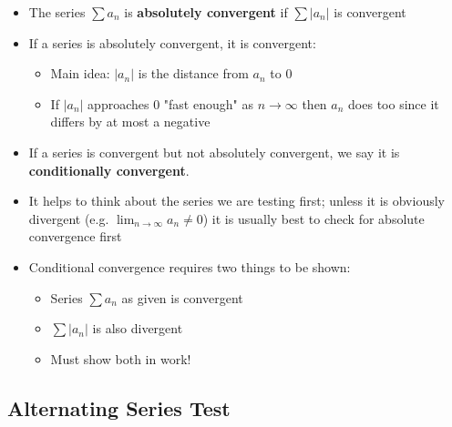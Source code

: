 \documentclass[letterpaper, 11pt, openany]{book}
\theoremstyle{mytheoremstyle}
\theoremstyle{myexamplestyle}
\begin{document}
\begin{itemize}
    \item The series $\sum a_{n}$ is \textbf{absolutely convergent} if $\sum |a_{n}|$ is convergent
    \item If a series is absolutely convergent, it is convergent:
    \begin{itemize}
        \item Main idea: $|a_{n}|$ is the distance from $a_{n}$ to 0
        \item If $|a_{n}|$ approaches 0 "fast enough" as $n \to \infty$ then $a_{n}$ does too since it differs by at most a negative
    \end{itemize}
    \item If a series is convergent but not absolutely convergent, we say it is \textbf{conditionally convergent}.
    \item It helps to think about the series we are testing first; unless it is obviously divergent (e.g. $\displaystyle \lim_{n \to \infty} a_{n} \neq 0$) it is usually best to check for absolute convergence first
    \item Conditional convergence requires two things to be shown:
    \begin{itemize}
        \item Series $\displaystyle \sum a_{n}$ as given is convergent
        \item $\displaystyle \sum |a_{n}|$ is also divergent
        \item[{\faExclamationTriangle[solid]}] Must show both in work!
    \end{itemize}
\end{itemize}

\subsection{Alternating Series Test}
\end{document}
